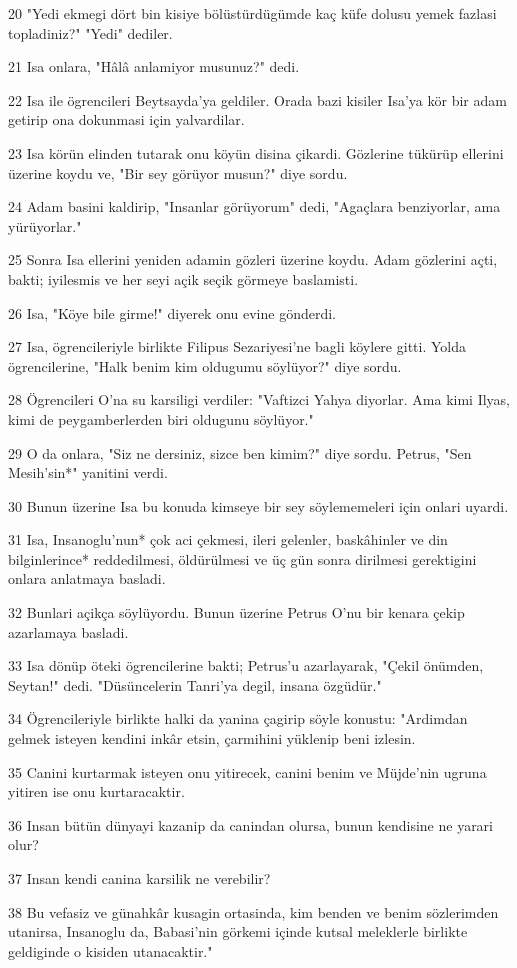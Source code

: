 \par 20 "Yedi ekmegi dört bin kisiye bölüstürdügümde kaç küfe dolusu yemek fazlasi topladiniz?" "Yedi" dediler.
\par 21 Isa onlara, "Hâlâ anlamiyor musunuz?" dedi.
\par 22 Isa ile ögrencileri Beytsayda'ya geldiler. Orada bazi kisiler Isa'ya kör bir adam getirip ona dokunmasi için yalvardilar.
\par 23 Isa körün elinden tutarak onu köyün disina çikardi. Gözlerine tükürüp ellerini üzerine koydu ve, "Bir sey görüyor musun?" diye sordu.
\par 24 Adam basini kaldirip, "Insanlar görüyorum" dedi, "Agaçlara benziyorlar, ama yürüyorlar."
\par 25 Sonra Isa ellerini yeniden adamin gözleri üzerine koydu. Adam gözlerini açti, bakti; iyilesmis ve her seyi açik seçik görmeye baslamisti.
\par 26 Isa, "Köye bile girme!" diyerek onu evine gönderdi.
\par 27 Isa, ögrencileriyle birlikte Filipus Sezariyesi'ne bagli köylere gitti. Yolda ögrencilerine, "Halk benim kim oldugumu söylüyor?" diye sordu.
\par 28 Ögrencileri O'na su karsiligi verdiler: "Vaftizci Yahya diyorlar. Ama kimi Ilyas, kimi de peygamberlerden biri oldugunu söylüyor."
\par 29 O da onlara, "Siz ne dersiniz, sizce ben kimim?" diye sordu. Petrus, "Sen Mesih'sin*" yanitini verdi.
\par 30 Bunun üzerine Isa bu konuda kimseye bir sey söylememeleri için onlari uyardi.
\par 31 Isa, Insanoglu'nun* çok aci çekmesi, ileri gelenler, baskâhinler ve din bilginlerince* reddedilmesi, öldürülmesi ve üç gün sonra dirilmesi gerektigini onlara anlatmaya basladi.
\par 32 Bunlari açikça söylüyordu. Bunun üzerine Petrus O'nu bir kenara çekip azarlamaya basladi.
\par 33 Isa dönüp öteki ögrencilerine bakti; Petrus'u azarlayarak, "Çekil önümden, Seytan!" dedi. "Düsüncelerin Tanri'ya degil, insana özgüdür."
\par 34 Ögrencileriyle birlikte halki da yanina çagirip söyle konustu: "Ardimdan gelmek isteyen kendini inkâr etsin, çarmihini yüklenip beni izlesin.
\par 35 Canini kurtarmak isteyen onu yitirecek, canini benim ve Müjde'nin ugruna yitiren ise onu kurtaracaktir.
\par 36 Insan bütün dünyayi kazanip da canindan olursa, bunun kendisine ne yarari olur?
\par 37 Insan kendi canina karsilik ne verebilir?
\par 38 Bu vefasiz ve günahkâr kusagin ortasinda, kim benden ve benim sözlerimden utanirsa, Insanoglu da, Babasi'nin görkemi içinde kutsal meleklerle birlikte geldiginde o kisiden utanacaktir."

